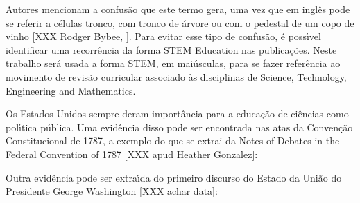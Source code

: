 \documentclass[
12pt,		%
openright,	%
twoside,  %
a4paper,			%
chapter=TITLE,		%
english,			%
french,				%
spanish,			%
brazil				%
]{USPSC-classe/USPSC_RedarTex}
\begin{document}
Autores mencionam a confus\~ao que este termo gera, uma vez que em ingl\^es pode se referir a c\'elulas tronco, com tronco de \'arvore ou com o pedestal de um copo de vinho [XXX Rodger Bybee, ]. Para evitar esse tipo de confus\~ao, \'e poss\'{\i}vel identificar uma recorr\^encia da forma \textquotedbl STEM Education nas publica\c{c}\~oes. Neste trabalho ser\'a usada a forma STEM, em mai\'usculas, para se fazer refer\^encia ao movimento de revis\~ao curricular associado \`as disciplinas de \textquotedbl Science, Technology, Engineering and Mathematics.  








Os Estados Unidos sempre deram import\^ancia para a educa\c{c}\~ao de ci\^encias como pol\'{\i}tica p\'ublica. Uma evid\^encia disso pode ser encontrada nas atas da Conven\c{c}\~ao Constitucional de 1787, a exemplo do que se extrai da \textquotedbl Notes of Debates in the Federal Convention of 1787 [XXX apud Heather Gonzalez]:









\noindent\begin{center}\mbox{\centering{}}\end{center}


Outra evid\^encia pode ser extra\'{\i}da do primeiro discurso do Estado da Uni\~ao do Presidente George Washington [XXX achar data]:









\noindent\begin{center}\mbox{\centering{}}\end{center}
\end{document}

